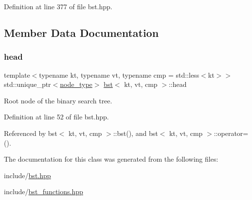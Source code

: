 Definition at line 377 of file bst.\+hpp.



\subsection{Member Data Documentation}
\mbox{\label{classbst_ad8177ec5ab205278efdae5ce94d613ba}} 
\subsubsection{\texorpdfstring{head}{head}}
{\footnotesize\ttfamily template$<$typename kt, typename vt, typename cmp = std\+::less$<$kt$>$$>$ \\
std\+::unique\+\_\+ptr$<$\hyperlink{classbst_a062eb2a1ac54802dbc4f0f74ae2afd01}{node\+\_\+type}$>$ \hyperlink{classbst}{bst}$<$ kt, vt, cmp $>$\+::head\hspace{0.3cm}{\ttfamily [private]}}

Root node of the binary search tree. 

Definition at line 52 of file bst.\+hpp.



Referenced by bst$<$ kt, vt, cmp $>$\+::bst(), and bst$<$ kt, vt, cmp $>$\+::operator=().



The documentation for this class was generated from the following files\+:\begin{DoxyCompactItemize}
\item 
include/\hyperlink{bst_8hpp}{bst.\+hpp}\item 
include/\hyperlink{bst__functions_8hpp}{bst\+\_\+functions.\+hpp}\end{DoxyCompactItemize}

